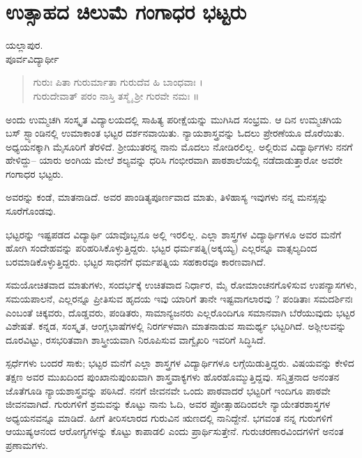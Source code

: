 \chapter{ಉತ್ಸಾಹದ ಚಿಲುಮೆ ಗಂಗಾಧರ ಭಟ್ಟರು}

\begin{center}
\smallskip
ಯಲ್ಲಾಪುರ.\\
ಪೂರ್ವವಿದ್ಯಾರ್ಥೀ 
\addrule
\end{center}
\begin{verse}
ಗುರುಃ ಪಿತಾ ಗುರುರ್ಮಾತಾ ಗುರುದೆವ ಹಿ ಬಾಂಧವಾಃ ।\\
ಗುರುದೇವಾತ್ ಪರಂ ನಾಸ್ತಿ ತಸ್ಮೈ ಶ್ರೀ ಗುರವೇ ನಮಃ ॥
\end{verse}
ಅಂದು ಉಮ್ಮಚಗಿ ಸಂಸ್ಕೃತ ವಿದ್ಯಾಲಯದಲ್ಲಿ ಸಾಹಿತ್ಯ ಪರೀಕ್ಷೆಯನ್ನು ಮುಗಿಸಿದ ಸಂಭ್ರಮ. ಆ ದಿನ ಉಮ್ಮಚಗಿಯ ಬಸ್ ಸ್ಟ್ಯಾಂಡಿನಲ್ಲಿ ಉಮಾಕಾಂತ ಭಟ್ಟರ ದರ್ಶನವಾಯಿತು. ನ್ಯಾಯಶಾಸ್ತ್ರವನ್ನು ಓದಲು ಪ್ರೇರಣೆಯೂ ದೊರೆಯಿತು. ಅಧ್ಯಯನಕ್ಕಾಗಿ ಮೈಸೂರಿಗೆ ತೆರಳಿದೆ. ಶ್ರೀಯುತರನ್ನ ನಾನು ಮೊದಲು ನೋಡಿರಲಿಲ್ಲ. ಅಲ್ಲಿರುವ ವಿದ್ಯಾರ್ಥಿಗಳು ನನಗೆ ಹೇಳಿದ್ದು– ಯಾರು ಅಂಗಿಯ ಮೇಲೆ ಶಲ್ಯವನ್ನು ಧರಿಸಿ ಗಂಭೀರವಾಗಿ ಪಾಠಶಾಲೆಯಲ್ಲಿ ನಡೆದಾಡುತ್ತಾರೋ ಅವರೇ ಗಂಗಾಧರ ಭಟ್ಟರು.

ಅವರನ್ನು ಕಂಡೆ, ಮಾತನಾಡಿದೆ. ಅವರ ಪಾಂಡಿತ್ಯಪೂರ್ಣವಾದ ಮಾತು, ತಿಳಿಹಾಸ್ಯ ಇವುಗಳು ನನ್ನ ಮನಸ್ಸನ್ನು ಸೂರೆಗೊಂಡವು.

ಭಟ್ಟರನ್ನು ಇಷ್ಟಪಡದ ವಿದ್ಯಾರ್ಥಿ ಯಾವೊಬ್ಬನೂ ಅಲ್ಲಿ ಇರಲಿಲ್ಲ. ಎಲ್ಲಾ ಶಾಸ್ತ್ರಗಳ ವಿದ್ಯಾರ್ಥಿಗಳೂ ಅವರ ಮನೆಗೆ ಹೋಗಿ ಸಂದೇಹವನ್ನು ಪರಿಹರಿಸಿಕೊಳ್ಳುತ್ತಿದ್ದರು. ಭಟ್ಟರ ಧರ್ಮಪತ್ನಿ(ಅಕ್ಕಯ್ಯ) ಎಲ್ಲರನ್ನೂ ವಾತ್ಸಲ್ಯದಿಂದ ಬರಮಾಡಿಕೊಳ್ಳುತ್ತಿದ್ದರು. ಭಟ್ಟರ ಸಾಧನೆಗೆ ಧರ್ಮಪತ್ನಿಯ ಸಹಕಾರವೂ ಕಾರಣವಾಗಿದೆ.

ಸಮಯೋಚಿತವಾದ ಮಾತುಗಳು, ಸಂದರ್ಭಕ್ಕೆ ಉಚಿತವಾದ ನಿರ್ಧಾರ, ಮೈ ರೋಮಾಂಚನಗೊಳಿಸುವ ಉಪನ್ಯಾಸಗಳು, ಸಮಯಪಾಲನೆ, ಎಲ್ಲರನ್ನೂ ಪ್ರೀತಿಸುವ ಹೃದಯ ಇವು ಯಾರಿಗೆ ತಾನೇ ಇಷ್ಟವಾಗಲಾರವು ? ಪಂಡಿತಾಃ ಸಮದರ್ಶಿನಃ ಎಂಬಂತೆ ಚಿಕ್ಕವರು, ದೊಡ್ಡವರು, ಪಂಡಿತರು, ಸಾಮಾನ್ಯಜನರು ಎಲ್ಲರೊಂದಿಗೂ ಸಮಾನವಾಗಿ ಬೆರೆಯುವುದು ಭಟ್ಟರ ವಿಶೇಷತೆ. ಕನ್ನಡ, ಸಂಸ್ಕೃತ, ಆಂಗ್ಲಭಾಷೆಗಳಲ್ಲಿ ನಿರರ್ಗಳವಾಗಿ ಮಾತನಾಡುವ ಸಾಮರ್ಥ್ಯ ಭಟ್ಟರಿಗಿದೆ. ಅಶ್ಲೀಲವನ್ನು ದೂರವಿಟ್ಟು, ರಸಭರಿತವಾಗಿ ಶಾಸ್ತ್ರೀಯವಾಗಿ ನಿರೂಪಿಸುವ ವಾಗ್ವೈಖರಿ ಇವರಿಗೆ ಸಿದ್ಧಿಸಿದೆ.

ಸ್ಪರ್ಧೆಗಳು ಬಂದರೆ ಸಾಕು; ಭಟ್ಟರ ಮನೆಗೆ ಎಲ್ಲಾ ಶಾಸ್ತ್ರಗಳ ವಿದ್ಯಾರ್ಥಿಗಳೂ ಲಗ್ಗೆಯಿಡುತ್ತಿದ್ದರು. ವಿಷಯವನ್ನು ಕೇಳಿದ ತಕ್ಷಣ ಅವರ ಮುಖದಿಂದ ಪುಂಖಾನುಪುಂಖವಾಗಿ ಶಾಸ್ತ್ರವಾಕ್ಯಗಳು ಹೊರಹೊಮ್ಮುತ್ತಿದ್ದವು. ಸನ್ಮಿತ್ರನಾದ ಅನಂತನ ಜೊತೆಗೂಡಿ ನ್ಯಾಯಶಾಸ್ತ್ರವನ್ನು ಪಠಿಸಿದೆ. ನನಗೆ ಜೀವನವೇ ಒಂದು ಪಾಠವಾದರೆ ಭಟ್ಟರಿಗೆ ಇಂದಿಗೂ ಪಾಠವೇ ಜೀವನವಾಗಿದೆ. ಗುರುಗಳಿಗೆ ಶ್ರಮವನ್ನು ಕೊಟ್ಟು ನಾನು ಓದಿ, ಅವರ ಪ್ರೋತ್ಸಾಹದಿಂದಲೇ ನ್ಯಾಯೇತರಶಾಸ್ತ್ರಗಳ ಅಧ್ಯಯನವನ್ನೂ ಮಾಡಿದೆ. ಹೀಗೆ ತೀರಿಸಲಾರದ ಗುರುವಿನ ಋಣದಲ್ಲಿ ನಾನಿದ್ದೇನೆ. ಭಗವಂತ ನನ್ನ ಗುರುಗಳಿಗೆ ಆಯುಷ್ಯಆನಂದ ಆರೋಗ್ಯಗಳನ್ನು ಕೊಟ್ಟು ಕಾಪಾಡಲಿ ಎಂದು ಪ್ರಾರ್ಥಿಸುತ್ತೇನೆ. ಗುರುಚರಣಾರವಿಂದಗಳಿಗೆ ಅನಂತ ಪ್ರಣಾಮಗಳು.

\articleend	
